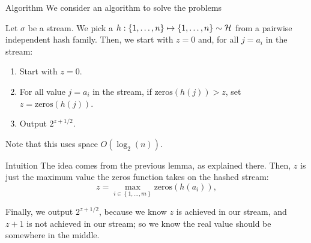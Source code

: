 \documentclass[a4paper]{article}
\begin{document}
\begin{parag}{Algorithm}
    We consider an algorithm to solve the  problems

    Let $\sigma$ be a stream. We pick a $h: \left\{1, \ldots, n\right\} \mapsto \left\{1, \ldots, n\right\} \followsdistr \mathcal{H}$ from a pairwise independent hash family. Then, we start with $z = 0$ and, for all $j = a_i$ in the stream:
    \begin{enumerate}
        
        \item Start with $z  = 0$.
        \item For all value $j = a_i$ in the stream, if $\text{zeros}\left(h\left(j\right)\right) > z$, set $z = \text{zeros}\left(h\left(j\right)\right)$.
        \item Output $2^{z + 1/2}$.
    \end{enumerate}

    Note that this uses space $O\left(\log_2\left(n\right)\right)$.
   
    \begin{subparag}{Intuition}
        The idea comes from the previous lemma, as explained there. Then, $z$ is just the maximum value the zeros function takes on the hashed stream:
        \[z = \max_{i \in \left\{1, \ldots, m\right\}} \text{zeros}\left(h\left(a_i\right)\right),\]

        Finally, we output $2^{z + 1/2}$, because we know $z$ is achieved in our stream, and $z + 1$ is not achieved in our stream; so we know the real value should be somewhere in the middle.
    \end{subparag}
\end{parag}
\end{document}
